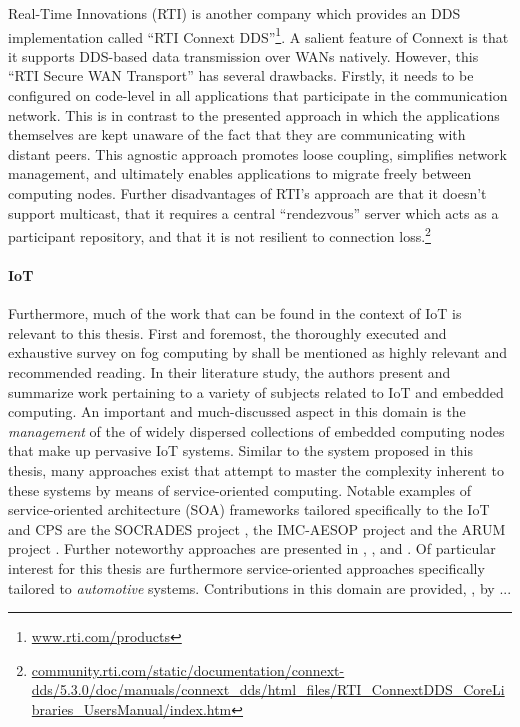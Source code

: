 Real-Time Innovations (RTI) is another company which provides an DDS implementation called ``RTI Connext DDS''\footnote{\url{www.rti.com/products}}. A salient feature of Connext is that it supports DDS-based data transmission over WANs natively. However, this ``RTI Secure WAN Transport'' has several drawbacks. Firstly, it needs to be configured on code-level in all applications that participate in the communication network. This is in contrast to the presented approach in which the applications themselves are kept unaware of the fact that they are communicating with distant peers. This agnostic approach promotes loose coupling, simplifies network management, and ultimately enables applications to migrate freely between computing nodes. Further disadvantages of RTI's approach are that it doesn't support multicast, that it requires a central ``rendezvous'' server which acts as a participant repository, and that it is not resilient to connection loss.\footnote{\url{community.rti.com/static/documentation/connext-dds/5.3.0/doc/manuals/connext_dds/html_files/RTI_ConnextDDS_CoreLibraries_UsersManual/index.htm}}


\paragraph{IoT}
Furthermore, much of the work that can be found in the context of IoT is relevant to this thesis. First and foremost, the thoroughly executed and exhaustive survey \cite{nath2018survey} on fog computing by \citeauthor*{nath2018survey} shall be mentioned as highly relevant and recommended reading. In their literature study, the authors present and summarize work pertaining to a variety of subjects related to IoT and embedded computing. 
An important and much-discussed aspect in this domain is the \emph{management} of the of widely dispersed collections of embedded computing nodes that make up pervasive IoT systems. Similar to the system proposed in this thesis, many approaches exist that attempt to master the complexity inherent to these systems by means of service-oriented computing. Notable examples of service-oriented architecture (SOA) frameworks tailored specifically to the IoT and CPS are the SOCRADES project \cite{cannata2008socrades}, the IMC-AESOP project \cite{karnouskos2012soa} and the ARUM project \cite{marin2013conceptual}. Further noteworthy approaches are presented in \cite{butzin2016microservices}, \cite{kart2007distributed}, and \cite{teixeira2011service}. Of particular interest for this thesis are furthermore service-oriented approaches specifically tailored to \emph{automotive} systems. Contributions in this domain are provided, \eg , by \citeauthor*{kugele2017service} \cite{kugele2017service}...

